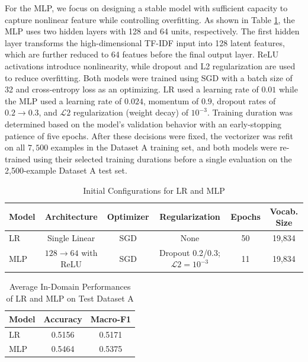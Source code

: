 \documentclass[letterpaper,conference,compsoc,onecolumn]{IEEEtran}
\begin{document}
For the MLP, we focus on designing a stable model with sufficient capacity to capture nonlinear feature while controlling overfitting. As shown in Table \ref{table:lr_mlp_architectures}, the MLP uses two hidden layers with 128 and 64 units, respectively.
The first hidden layer transforms the high-dimensional TF-IDF input into 128 latent features, which are further reduced to 64 featues before the final output layer.
ReLU activations introduce nonlinearity, while dropout and L2 regularization are used to reduce overfitting.
Both models were trained using SGD with a batch size of 32 and cross-entropy loss as an optimizing. LR used a learning rate of $0.01$ while the MLP used a learning rate of $0.024$, momentum of $0.9$, dropout rates of $0.2 \to 0.3$, and $\mathcal{L}2$ regularization (weight decay) of $10^{-3}$. Training duration was determined based on the model's validation behavior with an early-stopping patience of five epochs.
After these decisions were fixed, the vectorizer was refit on all $7,500$ examples in the Dataset A training set, and both models were re-trained using their selected training durations before a single evaluation on the 2,500-example Dataset A test set.

\begin{table}[h]
  \center
  \caption{Initial Configurations for LR and MLP}
  \label{table:lr_mlp_architectures}
  \begin{tabular}{lccccc}
    \hline
    \textbf{Model} & \textbf{Architecture} & \textbf{Optimizer} & \textbf{Regularization} & \textbf{Epochs} & \textbf{Vocab. Size} \\
    \hline
    LR & Single Linear & SGD & None & 50 & 19,834 \\
    MLP & $128 \to 64$ with ReLU & SGD & Dropout 0.2/0.3; $\mathcal{L}2=10^{-3}$ & 11 & 19,834\\
    \hline
  \end{tabular}
\end{table}

\begin{table}[h]
  \centering
  \caption{Average In-Domain Performances of LR and MLP on Test Dataset A}
  \label{table:lr_mlp_performance_on_tdsa}
  \begin{tabular}{lcc}
    \hline
    \textbf{Model} & \textbf{Accuracy} & \textbf{Macro-F1}\\
    \hline
    LR & 0.5156 & 0.5171\\
    MLP & 0.5464 & 0.5375\\
    \hline  
  \end{tabular}
\end{table}
\end{document}

